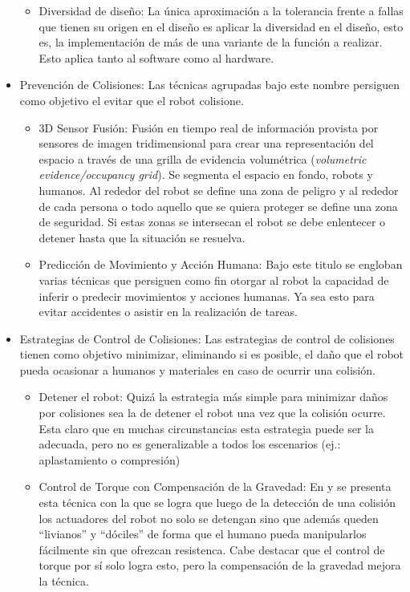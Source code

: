 \documentclass[withindex,glossary]{cam-thesis}
\begin{document}
\begin{itemize}
\begin{itemize}
		\item Diversidad de diseño: La única aproximación a la tolerancia frente a fallas que tienen su origen en el diseño es aplicar la diversidad en el diseño, esto es, la implementación de más de una variante de la función a realizar. Esto aplica tanto al software como al hardware. 
	\end{itemize}
\item Prevención de Colisiones:
  Las técnicas agrupadas bajo este nombre persiguen como objetivo el evitar que el robot colisione.
  \begin{itemize}
  	\item 3D Sensor Fusión: Fusión en tiempo real de información provista por sensores de imagen tridimensional para crear una representación del espacio a través de una grilla de evidencia volumétrica (\textit{volumetric evidence/occupancy grid}). Se segmenta el espacio en fondo, robots y humanos. Al rededor del robot se define una zona de peligro y al rededor de cada persona o todo aquello que se quiera proteger se define una zona de seguridad. Si estas zonas se intersecan el robot se debe enlentecer o detener hasta que la situación se resuelva.
    \item Predicción de Movimiento y Acción Humana: Bajo este titulo se engloban varias técnicas que persiguen como fin otorgar al robot la capacidad de inferir o predecir movimientos y acciones humanas. Ya sea esto para evitar accidentes o asistir en la realización de tareas. 
  \end{itemize}
\item Estrategias de Control de Colisiones:
  Las estrategias de control de colisiones tienen como objetivo minimizar, eliminando si es posible, el daño que el robot pueda ocasionar a humanos y materiales en caso de ocurrir una colisión. 
  \begin{itemize}
    \item Detener el robot: Quizá la estrategia más simple para minimizar daños por colisiones sea la de detener el robot una vez que la colisión ocurre. Esta claro que en muchas circunstancias esta estrategia puede ser la adecuada, pero no es generalizable a todos los escenarios (ej.: aplastamiento o compresión) 
    \item Control de Torque con Compensación de la Gravedad: En \cite{haddadin2008collision} y \cite{Luca2007} se presenta esta técnica con la que se logra que luego de la detección de una colisión los actuadores del robot no solo se detengan sino que además queden ``livianos'' y ``dóciles'' de forma que el humano pueda manipularlos fácilmente sin que ofrezcan resistenca. Cabe destacar que el control de torque por sí solo logra esto, pero la compensación de la gravedad mejora la técnica.

\end{itemize}
\end{itemize}
\end{document}
